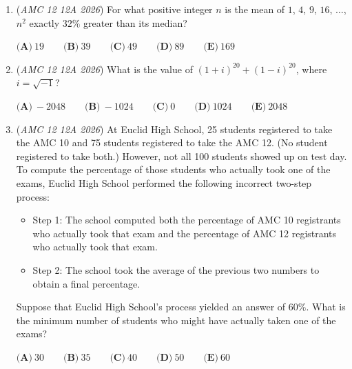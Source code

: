 \begin{enumerate}
	\item (\textit{AMC 12 12A 2026}) For what positive integer $n$ is the mean of $1$, $4$, $9$, $16$, $\dots$, $n^{2}$ exactly $32\%$ greater than its median?


 $\textbf{(A)}\   19  \qquad 	\textbf{(B)}\   39  \qquad 	\textbf{(C)}\   49  \qquad 	\textbf{(D)}\   89  \qquad 	\textbf{(E)}\   169$


	\item (\textit{AMC 12 12A 2026}) What is the value of $(1+i)^{20} + (1-i)^{20}$, where $i = \sqrt{-1}$?


 $\textbf{(A)}\   -2048  \qquad 	\textbf{(B)}\   -1024  \qquad 	\textbf{(C)}\   0  \qquad 	\textbf{(D)}\   1024  \qquad 	\textbf{(E)}\   2048$


	\item (\textit{AMC 12 12A 2026}) At Euclid High School, 25 students registered to take the AMC 10 and 75 students registered to take the AMC 12. (No student registered to take both.) However, not all 100 students showed up on test day. To compute the percentage of those students who actually took one of the exams, Euclid High School performed the following incorrect two-step process:


 
            \begin{itemize}
        \item Step 1: The school computed both the percentage of AMC 10 registrants who actually took that exam and the percentage of AMC 12 registrants who actually took that exam.
            \end{itemize}
            
            \begin{itemize}
        \item Step 2: The school took the average of the previous two numbers to obtain a final percentage.
            \end{itemize}
            Suppose that Euclid High School's process yielded an answer of $60\%$. What is the minimum number of students who might have actually taken one of the exams?


 $\textbf{(A)}\   30  \qquad 	\textbf{(B)}\   35  \qquad 	\textbf{(C)}\   40  \qquad 	\textbf{(D)}\   50  \qquad 	\textbf{(E)}\   60$



\end{enumerate}
